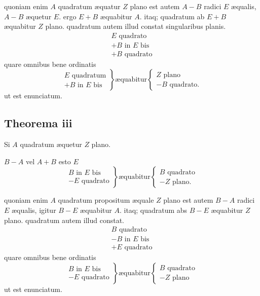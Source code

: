 \documentclass[11pt,a4paper]{article}
\begin{document}
quoniam enim $A$ quadratum æquatur $Z$ plano est autem $A - B$ radici $E$ æqualis, $A - B$ æquetur $E$. ergo $E + B$ æquabitur $A$. itaq; quadratum ab $E + B$ æquabitur $Z$ plano. quadratum autem illud constat singularibus planis.
\[ \begin{array}{l} E \text{ quadrato} \\ + B \text{ in } E \text{ bis} \\ + B \text{ quadrato} \end{array} \]
quare omnibus bene ordinatis
\[ \left.\begin{array}{l} E \text{ quadratum} \\ + B \text{ in } E \text{ bis} \end{array}\right\} \text{æquabitur} \left\{\begin{array}{l} Z \text{ plano} \\ - B \text{ quadrato.} \end{array}\right. \]
ut est enunciatum.

\subsection*{Theorema iii}

Si $A$ quadratum æquetur $Z$ plano.

$B - A$ vel $A + B$ esto $E$
\[ \left.\begin{array}{l} B \text{ in } E \text{ bis} \\ - E \text{ quadrato} \end{array}\right\} \text{æquabitur} \left\{\begin{array}{l} B \text{ quadrato} \\ - Z \text{ plano.} \end{array}\right. \]

quoniam enim $A$ quadratum propositum æquale $Z$ plano est autem $B - A$ radici $E$ æqualis, igitur $B - E$ æquabitur $A$. itaq; quadratum abs $B - E$ æquabitur $Z$ plano. quadratum autem illud constat.
\[ \begin{array}{l} B \text{ quadrato} \\ - B \text{ in } E \text{ bis} \\ + E \text{ quadrato} \end{array} \]
quare omnibus bene ordinatis
\[ \left.\begin{array}{l} B \text{ in } E \text{ bis} \\ - E \text{ quadrato} \end{array}\right\} \text{æquabitur} \left\{\begin{array}{l} B \text{ quadrato} \\ - Z \text{ plano} \end{array}\right. \]
ut est enunciatum.
\end{document}
